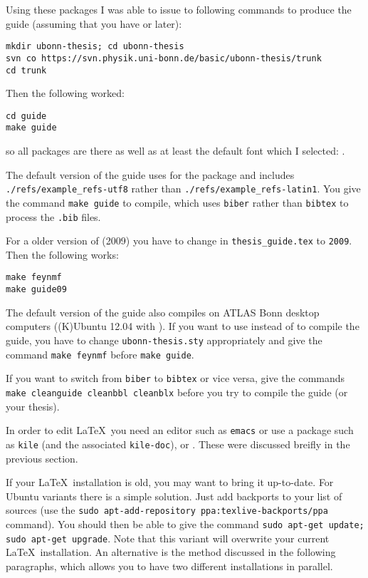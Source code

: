 \noindent
Using these packages I was able to issue to following commands to
produce the guide (assuming that you have  or later):
\begin{verbatim}
mkdir ubonn-thesis; cd ubonn-thesis
svn co https://svn.physik.uni-bonn.de/basic/ubonn-thesis/trunk
cd trunk
\end{verbatim}
Then the following worked:
\begin{verbatim}
cd guide
make guide
\end{verbatim}
so all packages are there as well as at least the default font which I
selected: .

The default version of the guide uses  for the
 package and includes\\
\texttt{./refs/example\_refs-utf8} rather than
\texttt{./refs/example\_refs-latin1}. You give the command \texttt{make
  guide} to compile, which uses \texttt{biber} rather than
\texttt{bibtex} to process the \texttt{.bib} files.

For a older version of \TeXLive (2009) you have to change
 in \texttt{thesis\_guide.tex} to \texttt{2009}. Then
the following works:
\begin{verbatim}
make feynmf
make guide09
\end{verbatim}

The default version of the guide also compiles on ATLAS Bonn desktop
computers ((K)Ubuntu 12.04 with ). If you want to use
 instead of  to compile the guide, you
have to change \texttt{ubonn-thesis.sty} appropriately and give the
command \texttt{make feynmf} before \texttt{make guide}.

If you want to switch from \texttt{biber} to
\texttt{bibtex} or vice versa, give the commands
\texttt{make cleanguide cleanbbl cleanblx} before you try to compile
the guide (or your thesis).

In order to edit \LaTeX\ you need an editor such as \texttt{emacs} or
use a package such as \texttt{kile} (and the associated
\texttt{kile-doc}), \TeXstudio or \TeXmaker. These were discussed
breifly in the previous section.

If your \LaTeX\ installation is old, you may want to bring it
up-to-date.  For Ubuntu variants there is a simple solution. Just add
\TeXLive backports to your list of sources (use the \texttt{sudo
  apt-add-repository ppa:texlive-backports/ppa} command). You should
then be able to give the command \texttt{sudo apt-get update; sudo
  apt-get upgrade}. Note that this variant will overwrite your current
\LaTeX\ installation. An alternative is the method discussed in the
following paragraphs, which allows you to have two different installations in
parallel.

